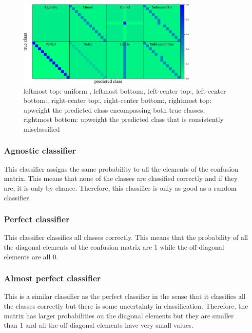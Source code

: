 \begin{figure}
	\begin{center}
    \includegraphics[width=0.8\textwidth]{./fig/all_sim_cm.png}
		\caption{leftmost top: uniform ,
    leftmost bottom:,
    left-center top:,
    left-center bottom:,
    right-center top:,
    right-center bottom:,
    rightmost top: upweight the predicted class encompassing both true classes,
    rightmost bottom: upweight the predicted class that is consistently misclassified}
		\label{fig:mock_cm}
	\end{center}
\end{figure}

\subsubsection{Agnostic classifier}
\label{sec:agnostic_data}

This classifier assigns the same probability to all the elements of the confusion matrix. This means that none of the classes are classified correctly and if they are, it is only by chance. Therefore, this classifier is only as good as a random classifier.

\subsubsection{Perfect classifier}
\label{sec:perfect_data}

This classifier classifies all classes correctly. This means that the probability of all the diagonal elements of the confusion matrix are 1 while the off-diagonal elements are all 0.

\subsubsection{Almost perfect classifier}
\label{sec:almost_data}

This is a similar classifier as the perfect classifier in the sense that it classifies all the classes correctly but there is some uncertainty in classification. Therefore, the matrix has larger probabilities on the diagonal elements but they are smaller than 1 and all the off-diagonal elements have very small values.

